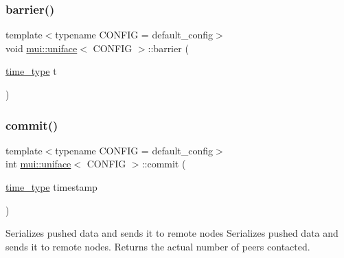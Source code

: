 \mbox{\label{classmui_1_1uniface_ab9543cf4c7a9d138cce36d711340b7f9}} 
\subsubsection{\texorpdfstring{barrier()}{barrier()}}
{\footnotesize\ttfamily template$<$typename C\+O\+N\+F\+IG  = default\+\_\+config$>$ \\
void \hyperlink{classmui_1_1uniface}{mui\+::uniface}$<$ C\+O\+N\+F\+IG $>$\+::barrier (\begin{DoxyParamCaption}\item[{\hyperlink{classmui_1_1uniface_a65cbecf1936d7d61cb45f14b1138dc07}{time\+\_\+type}}]{t }\end{DoxyParamCaption})\hspace{0.3cm}{\ttfamily [inline]}}

\mbox{\label{classmui_1_1uniface_ac6f846bd374007f583ccce646cb0a96f}} 
\subsubsection{\texorpdfstring{commit()}{commit()}}
{\footnotesize\ttfamily template$<$typename C\+O\+N\+F\+IG  = default\+\_\+config$>$ \\
int \hyperlink{classmui_1_1uniface}{mui\+::uniface}$<$ C\+O\+N\+F\+IG $>$\+::commit (\begin{DoxyParamCaption}\item[{\hyperlink{classmui_1_1uniface_a65cbecf1936d7d61cb45f14b1138dc07}{time\+\_\+type}}]{timestamp }\end{DoxyParamCaption})\hspace{0.3cm}{\ttfamily [inline]}}



Serializes pushed data and sends it to remote nodes Serializes pushed data and sends it to remote nodes. Returns the actual number of peers contacted. 

\mbox{\label{classmui_1_1uniface_acf7e84a01d20ef06dbcf4a1812456b24}} 
